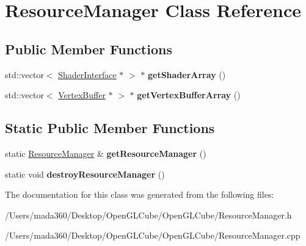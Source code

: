 \hypertarget{class_resource_manager}{}\section{Resource\+Manager Class Reference}
\label{class_resource_manager}
\subsection*{Public Member Functions}
\begin{DoxyCompactItemize}
\item 
\hypertarget{class_resource_manager_a76149a629ba8c22f26ad9d385e323af1}{}std\+::vector$<$ \hyperlink{class_shader_interface}{Shader\+Interface} $\ast$ $>$ $\ast$ {\bfseries get\+Shader\+Array} ()\label{class_resource_manager_a76149a629ba8c22f26ad9d385e323af1}

\item 
\hypertarget{class_resource_manager_afb9595acc189aa88fccad22c5f483769}{}std\+::vector$<$ \hyperlink{class_vertex_buffer}{Vertex\+Buffer} $\ast$ $>$ $\ast$ {\bfseries get\+Vertex\+Buffer\+Array} ()\label{class_resource_manager_afb9595acc189aa88fccad22c5f483769}

\end{DoxyCompactItemize}
\subsection*{Static Public Member Functions}
\begin{DoxyCompactItemize}
\item 
\hypertarget{class_resource_manager_ac7518dcf3792c23848c6cf93ce67e462}{}static \hyperlink{class_resource_manager}{Resource\+Manager} \& {\bfseries get\+Resource\+Manager} ()\label{class_resource_manager_ac7518dcf3792c23848c6cf93ce67e462}

\item 
\hypertarget{class_resource_manager_a95be72fdfb8965949f979846831eb4e1}{}static void {\bfseries destroy\+Resource\+Manager} ()\label{class_resource_manager_a95be72fdfb8965949f979846831eb4e1}

\end{DoxyCompactItemize}


The documentation for this class was generated from the following files\+:\begin{DoxyCompactItemize}
\item 
/\+Users/mada360/\+Desktop/\+Open\+G\+L\+Cube/\+Open\+G\+L\+Cube/Resource\+Manager.\+h\item 
/\+Users/mada360/\+Desktop/\+Open\+G\+L\+Cube/\+Open\+G\+L\+Cube/Resource\+Manager.\+cpp\end{DoxyCompactItemize}
